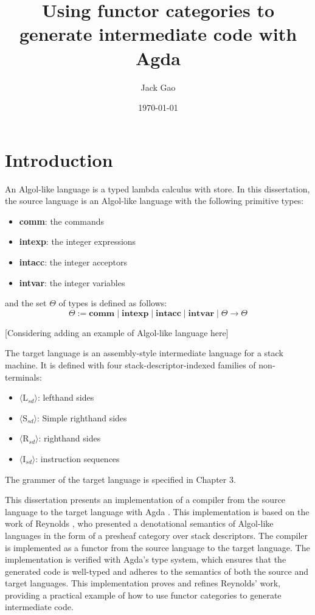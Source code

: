 \documentclass[12pt,twoside,a4paper]{report}
\theoremstyle{definition}
\begin{document}
\dominitoc

\title{Using functor categories to generate intermediate code with Agda}
\author{Jack Gao}
\date{\today}
\maketitle

\tableofcontents
\newpage

\chapter{Introduction}
    \minitoc
    An Algol-like language is a typed lambda calculus with store. In this dissertation, the source language is an Algol-like language with the following primitive types:
    \begin{itemize}
        \item 
            \textbf{comm}: the commands
        \item 
            \textbf{intexp}: the integer expressions
        \item 
            \textbf{intacc}: the integer acceptors
        \item 
            \textbf{intvar}: the integer variables
    \end{itemize}
    and the set $\Theta$ of types is defined as follows:
    \[ \Theta := \textbf{comm} \mid \textbf{intexp} \mid \textbf{intacc} \mid \textbf{intvar} \mid \Theta \to \Theta \]

    [Considering adding an example of Algol-like language here]

    The target language is an assembly-style intermediate language for a stack machine. It is defined with four stack-descriptor-indexed families of non-terminals: 
    \begin{itemize}
        \item 
            $\langle\text{L}_{sd}\rangle$: lefthand sides
        \item 
            $\langle\text{S}_{sd}\rangle$: Simple righthand sides
        \item
            $\langle\text{R}_{sd}\rangle$: righthand sides
        \item
            $\langle\text{I}_{sd}\rangle$: instruction sequences
    \end{itemize}

    The grammer of the target language is specified in Chapter 3.

    This dissertation presents an implementation of a compiler from the source language to the target language with Agda \cite{Agda}. This implementation is based on the work of Reynolds \cite{Reynolds}, who presented a denotational semantics of Algol-like languages in the form of a presheaf category over stack descriptors. The compiler is implemented as a functor from the source language to the target language. The implementation is verified with Agda's type system, which ensures that the generated code is well-typed and adheres to the semantics of both the source and target languages. This implementation proves and refines Reynolds' work, providing a practical example of how to use functor categories to generate intermediate code.
\end{document}
